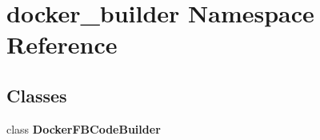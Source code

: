 \section{docker\+\_\+builder Namespace Reference}
\label{namespacedocker__builder}
\subsection*{Classes}
\begin{DoxyCompactItemize}
\item 
class {\bf Docker\+F\+B\+Code\+Builder}
\end{DoxyCompactItemize}

